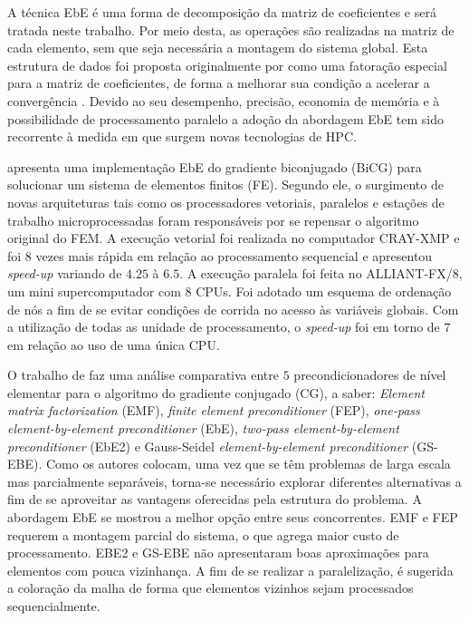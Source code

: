 \documentclass[
    12pt,               %
    openright,          %
    oneside,
    a4paper,            %
    english,            %
    french,             %
    spanish,            %
    brazil              %
    ]{abntex2}
\begin{document}
A técnica EbE é uma forma de decomposição da matriz de coeficientes e será tratada neste trabalho. Por meio desta, as operações são realizadas na matriz de cada elemento, sem que seja necessária a montagem do sistema global. Esta estrutura de dados foi proposta originalmente por  como uma fatoração especial para a matriz de coeficientes, de forma a melhorar sua condição a acelerar a convergência \cite{Carey1988}. Devido ao seu desempenho, precisão, economia de memória e à possibilidade de processamento paralelo \cite{Levit1987, Jing2008, Kiss2012} a adoção da abordagem EbE tem sido recorrente à medida em que surgem novas tecnologias de HPC. 

 apresenta uma implementação EbE do gradiente biconjugado (BiCG) para solucionar um sistema de elementos finitos (FE). Segundo ele, o surgimento de novas arquiteturas tais como os processadores vetoriais, paralelos e estações de trabalho microprocessadas foram responsáveis por se repensar o algoritmo original do FEM. A execução vetorial foi realizada no computador CRAY-XMP e foi $8$ vezes mais rápida em relação ao processamento sequencial e apresentou \textit{speed-up} variando de $4.25$ à $6.5$. A execução paralela foi feita no ALLIANT-FX/8, um mini supercomputador com $8$ CPUs. Foi adotado um esquema de ordenação de nós a fim de se evitar condições de corrida no acesso às variáveis globais. Com a utilização de todas as unidade de processamento, o \textit{speed-up} foi em torno de $7$ em relação ao uso de uma única CPU. 

O trabalho de  faz uma análise comparativa entre $5$ precondicionadores de nível elementar para o algoritmo do gradiente conjugado (CG), a saber: \textit{Element matrix factorization} (EMF), \textit{finite element preconditioner} (FEP), \textit{one-pass element-by-element preconditioner} (EbE), \textit{two-pass element-by-element preconditioner} (EbE2) e Gauss-Seidel \textit{element-by-element preconditioner} (GS-EBE). Como os autores colocam, uma vez que se têm problemas de larga escala mas parcialmente separáveis, torna-se necessário explorar diferentes alternativas a fim de se aproveitar as vantagens oferecidas pela estrutura do problema. A abordagem EbE se mostrou a melhor opção entre seus concorrentes. EMF e FEP requerem a montagem parcial do sistema, o que agrega maior custo de processamento. EBE2 e GS-EBE não apresentaram boas aproximações para elementos com pouca vizinhança. A fim de se realizar a paralelização, é sugerida a coloração da malha de forma que elementos vizinhos sejam processados sequencialmente.
\end{document}
